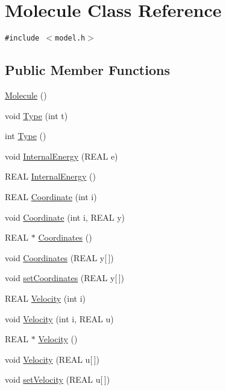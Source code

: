 \hypertarget{classMolecule}{
\section{Molecule Class Reference}
\label{classMolecule}
}
{\tt \#include $<$model.h$>$}

\subsection*{Public Member Functions}
\begin{CompactItemize}
\item 
\hyperlink{classMolecule_7e7d290ae641518ad4c4d5303b519d0f}{Molecule} ()
\item 
void \hyperlink{classMolecule_cc9589d399845b82ad02886a7075fe06}{Type} (int t)
\item 
int \hyperlink{classMolecule_cfda1c0c7b2f35dacc50e9859aad82c6}{Type} ()
\item 
void \hyperlink{classMolecule_44c2aad65d094a675610e1966e268031}{InternalEnergy} (REAL e)
\item 
REAL \hyperlink{classMolecule_a9587ec46e840a47f25acc2b9d49b32a}{InternalEnergy} ()
\item 
REAL \hyperlink{classMolecule_aee00f4809061c5e52b9abdbcbd9ed08}{Coordinate} (int i)
\item 
void \hyperlink{classMolecule_f9ce4f748a740168da3fcd3a8488c40c}{Coordinate} (int i, REAL y)
\item 
REAL $\ast$ \hyperlink{classMolecule_243725aba0af815b6abadee8c89cb291}{Coordinates} ()
\item 
void \hyperlink{classMolecule_a30f81c8d8e9199a6a6fdad9f93d3fef}{Coordinates} (REAL y\mbox{[}$\,$\mbox{]})
\item 
void \hyperlink{classMolecule_5cb53332e22df64ac0367fcef3222953}{setCoordinates} (REAL y\mbox{[}$\,$\mbox{]})
\item 
REAL \hyperlink{classMolecule_88aa88f5770c5f0c35e05dd401ae065b}{Velocity} (int i)
\item 
void \hyperlink{classMolecule_eb0a0b9273ac471af02a7b24700fb04d}{Velocity} (int i, REAL u)
\item 
REAL $\ast$ \hyperlink{classMolecule_6095c691e07aa1c0d6b1a51aaa95844a}{Velocity} ()
\item 
void \hyperlink{classMolecule_57214f734d0091fd3ece17dcd822ea24}{Velocity} (REAL u\mbox{[}$\,$\mbox{]})
\item 
void \hyperlink{classMolecule_a371f10f7878c6ca91c753004a3b9df5}{setVelocity} (REAL u\mbox{[}$\,$\mbox{]})

\end{CompactItemize}
